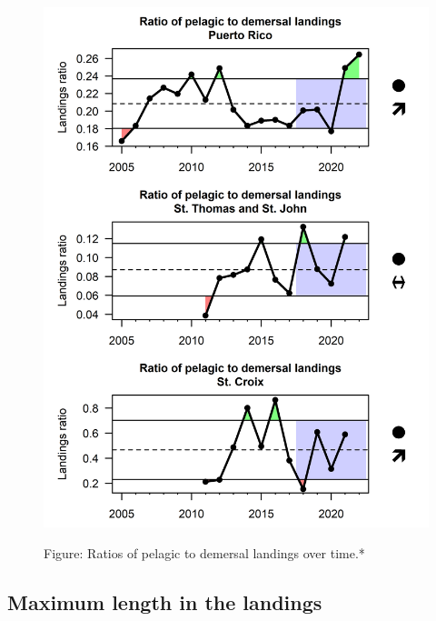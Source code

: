 \documentclass[
  letterpaper,
  oneside,
  open=any]{scrbook}
\begin{document}
\begin{figure}
\begin{minipage}{0.50\linewidth}
\begin{center}
\includegraphics[width=1\textwidth,height=\textheight]{indicator_plots/PD_ratio_plot_final.png}
\end{center}
\small *Figure: Ratios of pelagic to demersal landings over
time.*\end{minipage}%

\end{figure}%

\subsection{Maximum length in the
landings}\label{maximum-length-in-the-landings}
\end{document}
